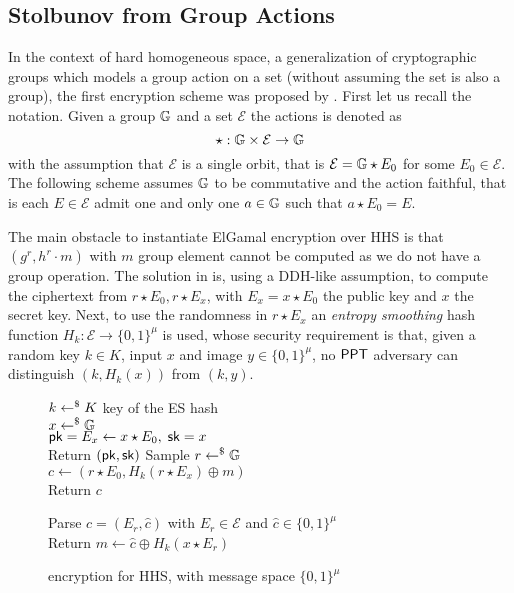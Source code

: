 \subsection{Stolbunov from Group Actions}

In the context of hard homogeneous space, a generalization of cryptographic groups which models a group action on a set (without assuming the set is also a group), the first encryption scheme was proposed by \cite{OTHER:Stolbunov10*}.
First let us recall the notation.
Given a group $\mathbb{G}$ and a set $\mathcal{E}$ the actions is denoted as
\[
	\star : \mathbb{G} \times \mathcal{E} \to \mathbb{G}
\]
with the assumption that $\mathcal{E}$ is a single orbit, that is $\mathcal{E} = \mathbb{G} \star E_0$ for some $E_0 \in \mathcal{E}$.
The following scheme assumes $\mathbb{G}$ to be commutative and the action faithful, that is each $E \in \mathcal{E}$ admit one and only one $a \in \mathbb{G}$ such that $a \star E_0 = E$.

The main obstacle to instantiate ElGamal encryption over HHS is that $(g^r, h^r \cdot m)$ with $m$ group element cannot be computed as we do not have a group operation.
The solution in \cite{OTHER:Stolbunov10*} is, using a DDH-like assumption, to compute the ciphertext from $r \star E_0, r \star E_x$, with $E_x = x \star E_0$ the public key and $x$ the secret key.
Next, to use the randomness in $r \star E_x$ an \textit{entropy smoothing} hash function $H_k : \mathcal{E} \to \{0, 1\}^\mu$ is used, whose security requirement is that, given a random key $k \in K$, input $x$ and image $y \in \{0, 1\}^\mu$, no $\mathsf{PPT}$ adversary can distinguish $(k, H_k(x))$ from $(k, y)$.


\begin{figure}[htb]
\centering
\begin{pcvstack}[center, space = 6pt]
\begin{pchstack}[center, space=12pt]
		{
			$k \gets^{\$} K$ key of the ES hash
				\\
			$x \gets^{\$} \mathbb{G}$
				\\
			$\mathsf{pk} = E_x \gets x \star E_0, \; \mathsf{sk} = x$
				\\
			Return $(\mathsf{pk}, \mathsf{sk})$
		}
		{
			Sample $r \gets^{\$} \mathbb{G}$
				\\
			$c \gets (r \star E_0, H_k(r \star E_x) \oplus m)$
				\\
			Return $c$
		}
\end{pchstack}
\begin{pchstack}[center]
		{
			Parse $c = (E_r, \hat{c})$ with $E_r \in \mathcal{E}$ and $\hat{c} \in \{0, 1\}^\mu$
				\\
			Return $m \gets \hat{c} \oplus H_k(x \star E_r)$
		}
\end{pchstack}
\end{pcvstack}
\label{prot:Stolbunov10}
\caption{\cite{OTHER:Stolbunov10*} encryption for HHS, with message space $\{0, 1\}^\mu$}
\end{figure}

